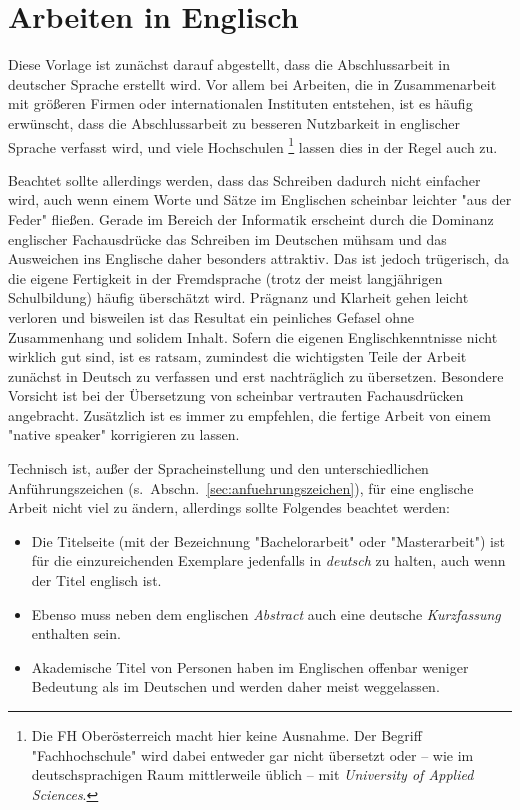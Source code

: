 \section{Arbeiten in Englisch}
\label{sec:englisch}

Diese Vorlage ist zunächst darauf abgestellt, dass die
Abschlussarbeit in deutscher Sprache erstellt wird. Vor allem bei
Arbeiten, die in Zusammenarbeit mit größeren Firmen oder
internationalen Instituten entstehen, ist es häufig erwünscht,
dass die Abschlussarbeit zu besseren Nutzbarkeit in englischer
Sprache verfasst wird, und viele Hochschulen%
\footnote{Die FH Oberösterreich macht hier keine Ausnahme. 
Der Begriff "Fachhochschule" wird dabei entweder gar nicht
übersetzt oder -- wie im deutschsprachigen Raum mittlerweile üblich -- 
mit \emph{University of Applied Sciences}.
} 
lassen dies in
der Regel auch zu.

Beachtet sollte allerdings werden, dass das Schreiben dadurch nicht
einfacher wird, auch wenn einem Worte und Sätze im Englischen
scheinbar leichter "aus der Feder" fließen. Gerade im Bereich
der Informatik erscheint durch die Dominanz englischer
Fachausdrücke das Schreiben im Deutschen mühsam und das Ausweichen
ins Englische daher besonders attraktiv. Das ist jedoch
trügerisch, da die eigene Fertigkeit in der Fremdsprache
(trotz der meist langjährigen Schulbildung) häufig überschätzt wird.
Prägnanz und Klarheit gehen leicht verloren und bisweilen ist das
Resultat ein peinliches Gefasel ohne Zusammenhang und solidem
Inhalt. Sofern die eigenen Englischkenntnisse nicht wirklich gut sind, ist
es ratsam, zumindest die wichtigsten Teile der Arbeit zunächst in
Deutsch zu verfassen und erst nachträglich zu übersetzen.
Besondere Vorsicht ist bei der Übersetzung von scheinbar
vertrauten Fachausdrücken angebracht. Zusätzlich ist es immer zu
empfehlen, die fertige Arbeit von einem "native speaker"
korrigieren zu lassen.



Technisch ist, außer der Spracheinstellung und den
unterschiedlichen Anführungszeichen (s.\
Abschn.~\ref{sec:anfuehrungszeichen}), für eine englische Arbeit
nicht viel zu ändern, allerdings sollte Folgendes beachtet werden:
%
\begin{itemize}
\item  Die Titelseite (mit der Bezeichnung "Bachelorarbeit" oder "Masterarbeit") 
ist für die einzureichenden Exemplare jedenfalls in \emph{deutsch} zu halten,
auch wenn der Titel englisch ist. 
\item Ebenso muss neben dem
englischen \emph{Abstract} auch eine deutsche \emph{Kurzfassung}
enthalten sein. %
\item Akademische Titel von Personen haben im Englischen offenbar
weniger Bedeutung als im Deutschen und werden daher meist
weggelassen.
\end{itemize}
